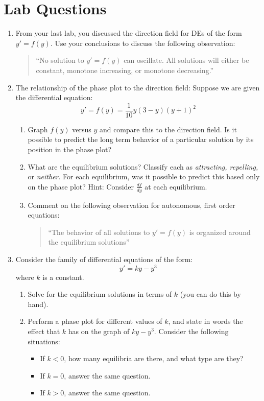 \documentclass[12pt]{amsart}
\begin{document}
\section{Lab Questions}
\begin{enumerate}
\item From your last lab, you discussed the direction field for
DEs of the form $y'=f(y)$.  Use your conclusions to discuss the
following observation:

\begin{quote}
``No solution to $y'=f(y)$ can oscillate.  All solutions will
either be constant, monotone increasing, or monotone decreasing.''
\end{quote}

\item The relationship of the phase plot to the direction field:
Suppose we are given the differential equation:
$$
y'=f(y)=\frac{1}{10}y(3-y)(y+1)^2
$$
\begin{enumerate}
\item Graph $f(y)$ versus $y$ and compare this to the direction
field.  Is it possible to predict the long term behavior of a
particular solution by its position in the phase plot?
\item What are the equilibrium solutions?  Classify each as {\it
attracting, repelling,} or {\it neither}.  For each equilibrium,
was it possible to predict this based only on the phase plot?
Hint:  Consider $\frac{df}{dy}$ at each equilibrium.
\item Comment on the following observation for autonomous, first
order equations:
\begin{quote}
``The behavior of all solutions to $y'=f(y)$ is organized around
the equilibrium solutions''
\end{quote}
\end{enumerate}
\item Consider the family of differential equations of the form:
$$
y'=ky-y^3
$$
where $k$ is a constant.
\begin{enumerate}
\item Solve for the equilibrium solutions in terms of $k$ (you can
do this by hand).
\item Perform a phase plot for different values of $k$, and state
in words the effect that $k$ has on the graph of $ky-y^3$.
Consider the following situations:
\begin{itemize}
\item If $k<0$, how many equilibria are there, and what type are
they?
\item If $k=0$, answer the same question.
\item If $k>0$, answer the same question.
\end{itemize}
\end{enumerate}


\end{enumerate}
\end{document}
